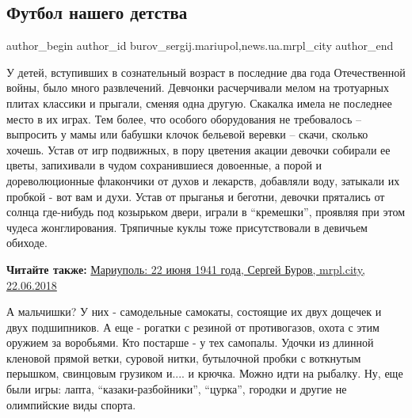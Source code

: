  
 
 
 
 
 
\subsection{Футбол нашего детства}
\label{sec:14_07_2018.stz.news.ua.mrpl_city.1.futbol_nashego_detstva}
 
\ifcmt
 author_begin
   author_id burov_sergij.mariupol,news.ua.mrpl_city
 author_end
\fi


У детей, вступивших в сознательный возраст в последние два года Отечественной
войны, было много развлечений. Девчонки расчерчивали мелом на тротуарных плитах
классики и прыгали, сменяя одна другую. Скакалка имела не последнее место в их
играх. Тем более, что особого оборудования не требовалось – выпросить у мамы
или бабушки клочок бельевой веревки – скачи, сколько хочешь. Устав от игр
подвижных, в пору цветения акации девочки собирали ее цветы, запихивали в чудом
сохранившиеся довоенные, а порой и дореволюционные флакончики от духов и
лекарств, добавляли воду, затыкали их пробкой - вот вам и духи. Устав от
прыганья и беготни, девочки прятались от солнца где-нибудь под козырьком двери,
играли в \enquote{кремешки}, проявляя при этом чудеса жонглирования. Тряпичные куклы
тоже присутствовали в девичьем обиходе.

\textbf{Читайте также:} \href{https://archive.org/details/22_06_2018.sergij_burov.mrpl_city.mariupol_22_iunja_1941_goda}{%
Мариуполь: 22 июня 1941 года, Сергей Буров, mrpl.city, 22.06.2018}

А мальчишки? У них - самодельные самокаты, состоящие их двух дощечек и двух
подшипников. А еще -  рогатки с резиной от противогазов, охота с этим оружием
за воробьями. Кто постарше - у тех самопалы. Удочки из длинной кленовой прямой
ветки, суровой нитки, бутылочной пробки с воткнутым перышком, свинцовым
грузиком и.... и крючка. Можно идти на рыбалку. Ну, еще были игры: лапта,
\enquote{казаки-разбойники}, \enquote{цурка}, городки и другие не олимпийские виды спорта.

